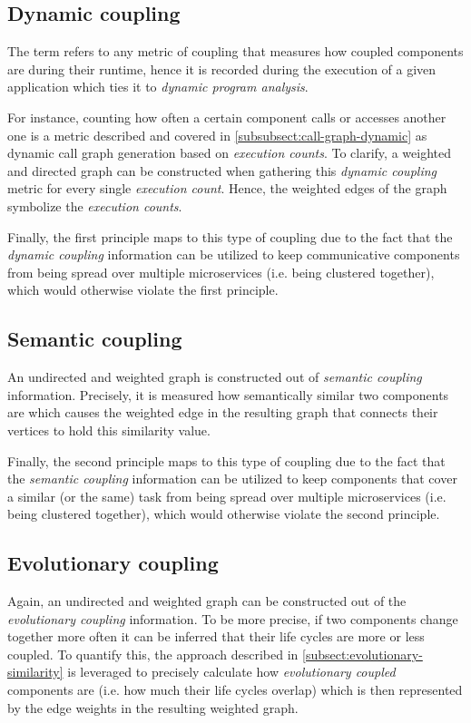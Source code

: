 \documentclass[12pt,a4paper]{report}
\begin{document}
\subsection{Dynamic coupling}

The term refers to any metric of coupling that measures how coupled
components are during their runtime, hence it is recorded during the execution
of a given application which ties it to \textit{dynamic program analysis}.

For instance, counting how often a certain component calls or accesses another
one is a metric described and covered in \ref{subsubsect:call-graph-dynamic}
as dynamic call graph generation based on \textit{execution counts}.
To clarify, a weighted and directed graph can be constructed when gathering
this \textit{dynamic coupling} metric for every single \textit{execution count}.
Hence, the weighted edges of the graph symbolize the \textit{execution counts}.

Finally, the first principle maps to this type of coupling due to the fact that
the \textit{dynamic coupling} information can be utilized to keep
communicative components from being spread over multiple microservices
(i.e. being clustered together), which would otherwise violate the first principle.


\subsection{Semantic coupling}

An undirected and weighted graph is constructed out of \textit{semantic coupling} information.
Precisely, it is measured how semantically similar two components are which
causes the weighted edge in the resulting graph that connects their vertices
to hold this similarity value.

Finally, the second principle maps to this type of coupling due to the fact that
the \textit{semantic coupling} information can be utilized to keep
components that cover a similar (or the same) task from being spread over
multiple microservices (i.e. being clustered together),
which would otherwise violate the second principle.


\subsection{Evolutionary coupling}

Again, an undirected and weighted graph can be constructed out of the
\textit{evolutionary coupling} information.
To be more precise, if two components change together more often it can be
inferred that their life cycles are more or less coupled.
To quantify this, the approach described in \ref{subsect:evolutionary-similarity}
is leveraged to precisely calculate how \textit{evolutionary coupled} components
are (i.e. how much their life cycles overlap) which is then represented
by the edge weights in the resulting weighted graph.
\end{document}
